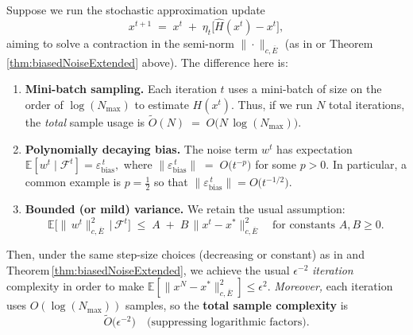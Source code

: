 \begin{theorem}
\label{thm:MiniBatchDecayingBias}
Suppose we run the stochastic approximation update
\begin{equation}\label{eq:MiniBatchUpdate}
  x^{t+1} \;=\; x^t \;+\; \eta_t \bigl[\widehat{H}(x^t) - x^t\bigr],
\end{equation}
aiming to solve a contraction in the semi-norm
\(\|\!\cdot\!\|_{c,\overline{E}}\) (as in 
\citep[Assumption\,4]{zhang2021finite}
or Theorem\,\ref{thm:biasedNoiseExtended} above).
The difference here is:
\begin{enumerate}
\item \textbf{Mini-batch sampling.} 
  Each iteration \(t\) uses a mini-batch of size on the order of
  \(\log(N_{\max})\) 
  to estimate \(H(x^t)\).  Thus, if we run \(N\) total iterations, the \emph{total} sample usage is
  \(\widetilde{O}(N) \;=\; O\bigl(N \,\log(N_{\max})\bigr)\).
\item \textbf{Polynomially decaying bias.}
  The noise term \(w^t\) has expectation
  \(\mathbb{E}[w^t\mid\mathcal{F}^t] 
    = \varepsilon_{\text{bias}}^{\,t},\)
  where
  \(\|\varepsilon_{\text{bias}}^{\,t}\|\;=\;O\bigl(t^{-p}\bigr)\)
  for some \(p>0\).
  In particular, a common example is \(p=\tfrac12\) so that
  \(\|\varepsilon_{\text{bias}}^{\,t}\| = O\bigl(t^{-1/2}\bigr)\).
\item \textbf{Bounded (or mild) variance.} 
  We retain the usual assumption:
  \[
    \mathbb{E}\bigl[\|\,w^t\|_{c,\overline{E}}^2 
      \,\big|\,
      \mathcal{F}^t\bigr]
    \;\le\;
    A \;+\; B\,\|x^t - x^*\|_{c,\overline{E}}^2
    \quad\text{for constants }A,B\!\ge0.
  \]
\end{enumerate}
Then, under the same step-size choices (decreasing or constant) as in 
\citep[Theorem\,3]{zhang2021finite}
and Theorem\,\ref{thm:biasedNoiseExtended}, we achieve the usual 
\(\epsilon^{-2}\) \emph{iteration} complexity in order to make
\(\mathbb{E}[\|x^N-x^*\|_{c,\overline{E}}^2]\le \epsilon^2\).  
\emph{Moreover,} each iteration uses 
\(O(\log(N_{\max}))\) samples, so the \textbf{total sample complexity} is
\[
  \widetilde{O}\bigl(\epsilon^{-2}\bigr)
  \quad
  \text{(suppressing logarithmic factors).}
\]

\end{theorem}

